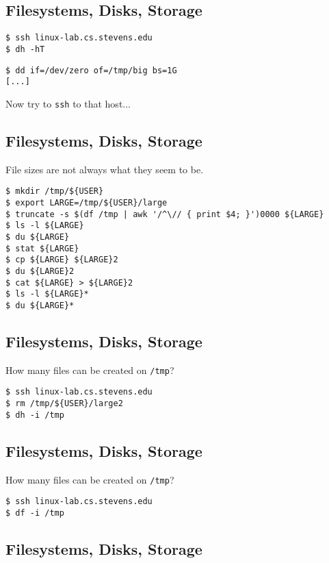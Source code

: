 \documentclass[xga]{xdvislides}
\begin{document}
\subsection{Filesystems, Disks, Storage}
\begin{verbatim}
$ ssh linux-lab.cs.stevens.edu
$ dh -hT
\end{verbatim}

\begin{verbatim}
$ dd if=/dev/zero of=/tmp/big bs=1G
[...]
\end{verbatim}

Now try to {\tt ssh} to that host...

\subsection{Filesystems, Disks, Storage}

File sizes are not always what they seem to be.

\begin{verbatim}
$ mkdir /tmp/${USER}
$ export LARGE=/tmp/${USER}/large
$ truncate -s $(df /tmp | awk '/^\// { print $4; }')0000 ${LARGE}
$ ls -l ${LARGE}
$ du ${LARGE}
$ stat ${LARGE}
$ cp ${LARGE} ${LARGE}2
$ du ${LARGE}2
$ cat ${LARGE} > ${LARGE}2
$ ls -l ${LARGE}*
$ du ${LARGE}*
\end{verbatim}

\subsection{Filesystems, Disks, Storage}
How many files can be created on {\tt /tmp}?

\begin{verbatim}
$ ssh linux-lab.cs.stevens.edu
$ rm /tmp/${USER}/large2
$ dh -i /tmp
\end{verbatim}

\subsection{Filesystems, Disks, Storage}
How many files can be created on {\tt /tmp}?

\begin{verbatim}
$ ssh linux-lab.cs.stevens.edu
$ df -i /tmp
\end{verbatim}

\subsection{Filesystems, Disks, Storage}
\end{document}
